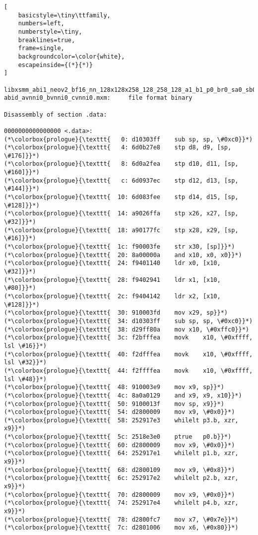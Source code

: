 \documentclass[a4paper,10pt]{article}
\begin{document}
\begin{lstlisting}[
    basicstyle=\tiny\ttfamily,
    numbers=left,
    numberstyle=\tiny,
    breaklines=true,
    frame=single,
    backgroundcolor=\color{white},
    escapeinside={(*}{*)}
]

libxsmm_abi1_neov2_bf16_nn_128x128x258_128_258_128_a1_b1_p0_br0_sa0_sb0_uh0_si0_tc-abid_avnni0_bvnni0_cvnni0.mxm:     file format binary

Disassembly of section .data:

0000000000000000 <.data>:
(*\colorbox{prologue}{\texttt{   0:	d10303ff 	sub	sp, sp, \#0xc0}}*)
(*\colorbox{prologue}{\texttt{   4:	6d0b27e8 	stp	d8, d9, [sp, \#176]}}*)
(*\colorbox{prologue}{\texttt{   8:	6d0a2fea 	stp	d10, d11, [sp, \#160]}}*)
(*\colorbox{prologue}{\texttt{   c:	6d0937ec 	stp	d12, d13, [sp, \#144]}}*)
(*\colorbox{prologue}{\texttt{  10:	6d083fee 	stp	d14, d15, [sp, \#128]}}*)
(*\colorbox{prologue}{\texttt{  14:	a9026ffa 	stp	x26, x27, [sp, \#32]}}*)
(*\colorbox{prologue}{\texttt{  18:	a90177fc 	stp	x28, x29, [sp, \#16]}}*)
(*\colorbox{prologue}{\texttt{  1c:	f90003fe 	str	x30, [sp]}}*)
(*\colorbox{prologue}{\texttt{  20:	8a00000a 	and	x10, x0, x0}}*)
(*\colorbox{prologue}{\texttt{  24:	f9401140 	ldr	x0, [x10, \#32]}}*)
(*\colorbox{prologue}{\texttt{  28:	f9402941 	ldr	x1, [x10, \#80]}}*)
(*\colorbox{prologue}{\texttt{  2c:	f9404142 	ldr	x2, [x10, \#128]}}*)
(*\colorbox{prologue}{\texttt{  30:	910003fd 	mov	x29, sp}}*)
(*\colorbox{prologue}{\texttt{  34:	d10303ff 	sub	sp, sp, \#0xc0}}*)
(*\colorbox{prologue}{\texttt{  38:	d29ff80a 	mov	x10, \#0xffc0}}*)
(*\colorbox{prologue}{\texttt{  3c:	f2bfffea 	movk	x10, \#0xffff, lsl \#16}}*)
(*\colorbox{prologue}{\texttt{  40:	f2dfffea 	movk	x10, \#0xffff, lsl \#32}}*)
(*\colorbox{prologue}{\texttt{  44:	f2ffffea 	movk	x10, \#0xffff, lsl \#48}}*)
(*\colorbox{prologue}{\texttt{  48:	910003e9 	mov	x9, sp}}*)
(*\colorbox{prologue}{\texttt{  4c:	8a0a0129 	and	x9, x9, x10}}*)
(*\colorbox{prologue}{\texttt{  50:	9100013f 	mov	sp, x9}}*)
(*\colorbox{prologue}{\texttt{  54:	d2800009 	mov	x9, \#0x0}}*)
(*\colorbox{prologue}{\texttt{  58:	252917e3 	whilelt	p3.b, xzr, x9}}*)
(*\colorbox{prologue}{\texttt{  5c:	2518e3e0 	ptrue	p0.b}}*)
(*\colorbox{prologue}{\texttt{  60:	d2800009 	mov	x9, \#0x0}}*)
(*\colorbox{prologue}{\texttt{  64:	252917e1 	whilelt	p1.b, xzr, x9}}*)
(*\colorbox{prologue}{\texttt{  68:	d2800109 	mov	x9, \#0x8}}*)
(*\colorbox{prologue}{\texttt{  6c:	252917e2 	whilelt	p2.b, xzr, x9}}*)
(*\colorbox{prologue}{\texttt{  70:	d2800009 	mov	x9, \#0x0}}*)
(*\colorbox{prologue}{\texttt{  74:	252917e4 	whilelt	p4.b, xzr, x9}}*)
(*\colorbox{prologue}{\texttt{  78:	d2800fc7 	mov	x7, \#0x7e}}*)
(*\colorbox{prologue}{\texttt{  7c:	d2801006 	mov	x6, \#0x80}}*)


\end{lstlisting}
\end{document}
